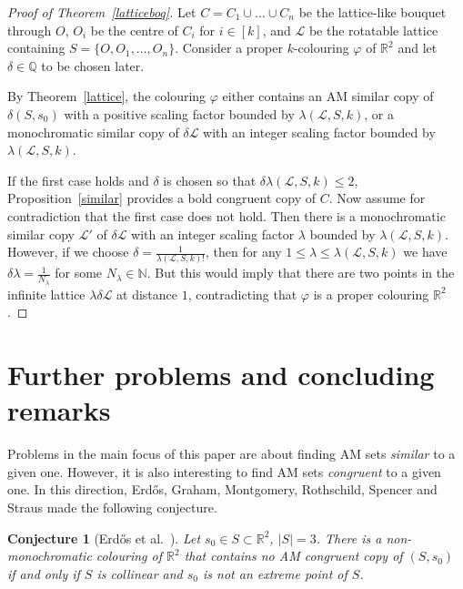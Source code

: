 \documentclass[12pt]{article}
\newcommand{\R}{{\mathbb R}}
\renewcommand{\L}{{\mathcal L}}
\theoremstyle{plain}
\newtheorem{conjecture}[theorem]{Conjecture}
\theoremstyle{definition}
\begin{document}
\begin{proof}[Proof of Theorem~\ref{latticeboq}] Let $C=C_1\cup\dots\cup C_n$ be the lattice-like bouquet through $O$, $O_i$ be the centre of $C_i$ for $i\in[k]$, and $\L$ be the rotatable lattice containing $S=\{O,O_1,\dots,O_n\}$. Consider a proper $k$-colouring $\varphi$ of $\mathbb{R}^2$ and let $\delta\in \mathbb{Q}$ to be chosen later.

By Theorem~\ref{lattice}, the colouring $\varphi$ either contains an AM similar copy of $\delta (S,s_0)$  with a positive scaling factor bounded by $\lambda(\L,S,k)$, or a monochromatic similar copy of $\delta\L$ with an integer scaling factor bounded by $\lambda(\L,S,k)$.

If the first case holds and $\delta$ is chosen so that $\delta \lambda(\L,S,k)\leq 2$, Proposition~\ref{similar} provides a bold congruent copy of $C$. Now assume for contradiction that the first case does not hold. Then there is a monochromatic similar copy $\L'$ of $\delta \L$ with an integer scaling factor $\lambda$ bounded by $\lambda(\L,S,k)$. However, if we choose $\delta=\frac 1{\lambda(\L,S,k)!}$, then for any $1\leq \lambda\leq \lambda(\L,S,k)$ we have $\delta\lambda=\frac{1}{N_{\lambda}}$ for some $N_{\lambda}\in \mathbb{N}$. But this would imply that there are two points in the infinite lattice $\lambda\delta \L$ at distance $1$, contradicting that $\varphi$ is a proper colouring $\mathbb{R}^2$.
\end{proof}







\section{Further problems and concluding remarks}\label{5}

Problems in the main focus of this paper are about finding AM sets \emph{similar} to a given one. However, it is also interesting to find AM sets \emph{congruent} to a given one. In this direction, Erd\H os, Graham, Montgomery, Rothschild, Spencer and Straus made the following conjecture.

\begin{conjecture}[Erd\H os et al.~\cite{EGMRSS3}]\label{erdosconj}
Let $s_0\in S\subset\R^2$, $|S|=3$.
There is a non-monochromatic colouring of $\R^2$ that contains no AM congruent copy of $(S,s_0)$ if and only if $S$ is collinear and $s_0$ is not an extreme point of $S$.
\end{conjecture}
\end{document}
